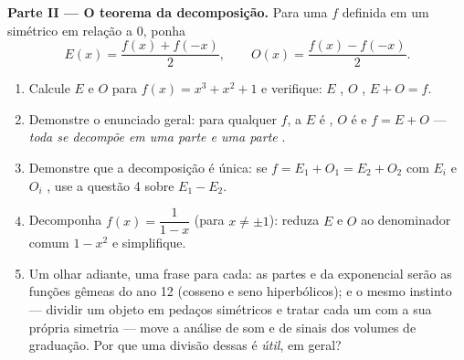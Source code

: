 \begin{problem}
\medskip
\noindent\textbf{Parte II --- O teorema da decomposição.}
Para uma  $f$ definida em um  simétrico em relação a
$0$, ponha
\[
E(x) = \frac{f(x) + f(-x)}{2},
\qquad
O(x) = \frac{f(x) - f(-x)}{2} .
\]
\begin{enumerate}[resume]
  \item Calcule $E$ e $O$ para $f(x) = x^3 + x^2 + 1$ e
        verifique: $E$ , $O$ , $E + O = f$.
  \item Demonstre o enunciado geral: para qualquer $f$, a 
        $E$ é , $O$ é  e $f = E + O$ --- \emph{toda
         se decompõe em uma parte  e uma parte }.
  \item Demonstre que a decomposição é única: se
        $f = E_1 + O_1 = E_2 + O_2$ com $E_i$  e $O_i$ ,
        use a questão 4 sobre $E_1 - E_2$.
  \item Decomponha $f(x) = \dfrac{1}{1 - x}$ (para
        $x \neq \pm 1$): reduza $E$ e $O$ ao denominador comum
        $1 - x^2$ e simplifique.
  \item Um olhar adiante, uma frase para cada: as partes  e
         da  exponencial serão as funções gêmeas do
        ano 12 (cosseno e seno hiperbólicos); e o mesmo instinto
        --- dividir um objeto em pedaços simétricos e tratar cada
        um com a sua própria simetria --- move a análise de som e
        de sinais dos volumes de graduação. Por que uma divisão
        dessas é \emph{útil}, em geral?
\end{enumerate}


\end{problem}
